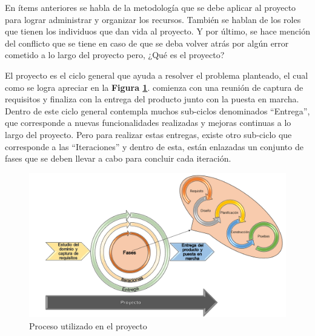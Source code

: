 En ítems anteriores se habla de la metodología que se debe aplicar al proyecto para lograr administrar y organizar los recursos. También se hablan de los roles que tienen los individuos que dan vida al proyecto. Y por último, se hace mención del conflicto que se tiene en caso de que se deba volver atrás por algún error cometido a lo largo del proyecto pero, ¿Qué es el proyecto?

El proyecto es el ciclo general que ayuda a resolver el problema planteado, el cual como se logra apreciar en la \textbf{Figura \ref{fig: Proceso_Proyecto}}. comienza con una reunión de captura de requisitos y finaliza con la entrega del producto junto con la puesta en marcha. Dentro de este ciclo general contempla muchos sub-ciclos denominados ``Entrega'', que corresponde a nuevas funcionalidades realizadas y mejoras continuas a lo largo del proyecto. Pero para realizar estas entregas, existe otro sub-ciclo que corresponde a las ``Iteraciones'' y dentro de esta, están enlazadas un conjunto de fases que se deben llevar a cabo para concluir cada iteración.

\begin{figure}[!htbp]
    \hspace{-9mm}
    \includegraphics[width=1.1\textwidth]{Imagenes/Proceso_Proyecto.png}
    \caption{\label{fig: Proceso_Proyecto}Proceso utilizado en el proyecto}
\end{figure}